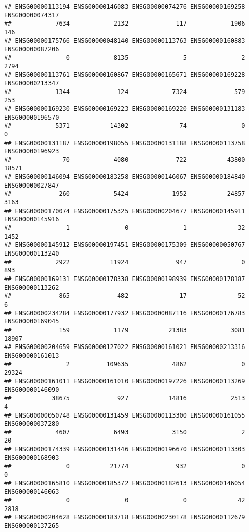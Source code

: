 \documentclass[
]{article}
\begin{document}
\begin{verbatim}
## ENSG00000113194 ENSG00000146083 ENSG00000074276 ENSG00000169258 ENSG00000074317 
##            7634            2132             117            1906             146 
## ENSG00000175766 ENSG00000048140 ENSG00000113763 ENSG00000160883 ENSG00000087206 
##               0            8135               5               2            2794 
## ENSG00000113761 ENSG00000160867 ENSG00000165671 ENSG00000169228 ENSG00000213347 
##            1344             124            7324             579             253 
## ENSG00000169230 ENSG00000169223 ENSG00000169220 ENSG00000131183 ENSG00000196570 
##            5371           14302              74               0               0 
## ENSG00000131187 ENSG00000198055 ENSG00000131188 ENSG00000113758 ENSG00000196923 
##              70            4080             722           43800           18571 
## ENSG00000146094 ENSG00000183258 ENSG00000146067 ENSG00000184840 ENSG00000027847 
##             260            5424            1952           24857            3163 
## ENSG00000170074 ENSG00000175325 ENSG00000204677 ENSG00000145911 ENSG00000145916 
##               1               0               1              32            1452 
## ENSG00000145912 ENSG00000197451 ENSG00000175309 ENSG00000050767 ENSG00000113240 
##            2922           11924             947               0             893 
## ENSG00000169131 ENSG00000178338 ENSG00000198939 ENSG00000178187 ENSG00000113262 
##             865             482              17              52               6 
## ENSG00000234284 ENSG00000177932 ENSG00000087116 ENSG00000176783 ENSG00000169045 
##             159            1179           21383            3081           18907 
## ENSG00000204659 ENSG00000127022 ENSG00000161021 ENSG00000213316 ENSG00000161013 
##               2          109635            4862               0           29324 
## ENSG00000161011 ENSG00000161010 ENSG00000197226 ENSG00000113269 ENSG00000146090 
##           38675             927           14816            2513               4 
## ENSG00000050748 ENSG00000131459 ENSG00000113300 ENSG00000161055 ENSG00000037280 
##            4607            6493            3150               2              20 
## ENSG00000174339 ENSG00000131446 ENSG00000196670 ENSG00000113303 ENSG00000168903 
##               0           21774             932               0               0 
## ENSG00000165810 ENSG00000185372 ENSG00000182613 ENSG00000146054 ENSG00000146063 
##               0               0               0              42            2818 
## ENSG00000204628 ENSG00000183718 ENSG00000230178 ENSG00000112679 ENSG00000137265 

\end{verbatim}
\end{document}

